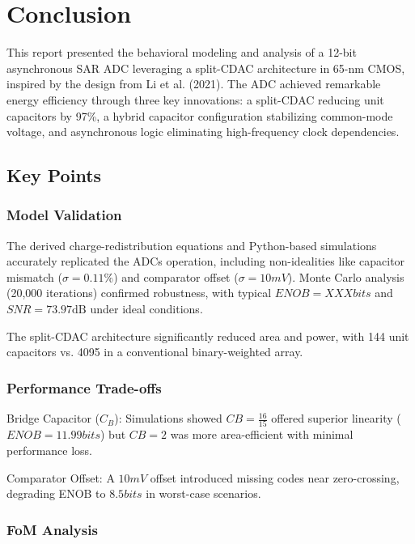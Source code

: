\section{Conclusion}
\label{sec:conclusion}

This report presented the behavioral modeling and analysis of a 12-bit asynchronous SAR ADC leveraging a split-CDAC architecture in 65-nm CMOS, inspired by the design from Li et al. (2021). The ADC achieved remarkable energy efficiency through three key innovations: a split-CDAC reducing unit capacitors by 97\%, a hybrid capacitor configuration stabilizing common-mode voltage, and asynchronous logic eliminating high-frequency clock dependencies.

\subsection{Key Points}

\subsubsection{Model Validation}

The derived charge-redistribution equations and Python-based simulations accurately replicated the ADCs operation, including non-idealities like capacitor mismatch ($\sigma=0.11\%$) and comparator offset ($\sigma=10 mV$). Monte Carlo analysis (20,000 iterations) confirmed robustness, with typical $ENOB = XXX \si{bits}$ and $SNR = 73.97 \si{\dB}$ under ideal conditions.

The split-CDAC architecture significantly reduced area and power, with 144 unit capacitors vs. 4095 in a conventional binary-weighted array.

\subsubsection{Performance Trade-offs}

Bridge Capacitor ($C_B$): Simulations showed $CB=\frac{16}{15}$ offered superior linearity ($ENOB =11.99 bits$) but $CB=2$ was more area-efficient with minimal performance loss.

Comparator Offset: A $10 mV$ offset introduced missing codes near zero-crossing, degrading ENOB to $8.5 bits$ in worst-case scenarios.

\subsubsection{FoM Analysis}

